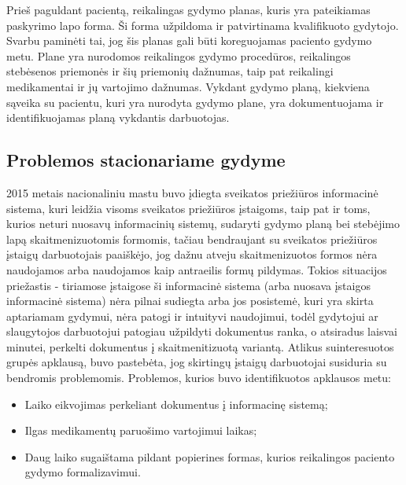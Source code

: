 Prieš paguldant pacientą, reikalingas gydymo planas, kuris yra pateikiamas paskyrimo lapo forma. Ši forma užpildoma ir patvirtinama kvalifikuoto gydytojo. Svarbu paminėti tai, jog šis planas gali būti koreguojamas paciento gydymo metu. Plane yra nurodomos reikalingos gydymo procedūros, reikalingos stebėsenos priemonės ir šių priemonių dažnumas, taip pat reikalingi medikamentai ir jų vartojimo dažnumas. Vykdant gydymo planą, kiekviena sąveika su pacientu, kuri yra nurodyta gydymo plane, yra dokumentuojama ir identifikuojamas planą vykdantis darbuotojas.
\subsection{Problemos stacionariame gydyme}
2015 metais nacionaliniu mastu buvo įdiegta sveikatos priežiūros informacinė sistema, kuri leidžia visoms sveikatos priežiūros įstaigoms, taip pat ir toms, kurios neturi nuosavų informacinių sistemų, sudaryti gydymo planą bei stebėjimo lapą skaitmenizuotomis formomis, tačiau bendraujant su sveikatos priežiūros įstaigų darbuotojais paaiškėjo, jog dažnu atveju skaitmenizuotos formos nėra naudojamos arba naudojamos kaip antraeilis formų pildymas. Tokios situacijos priežastis - tiriamose įstaigose ši informacinė sistema (arba nuosava įstaigos informacinė sistema) nėra pilnai sudiegta arba jos posistemė, kuri yra skirta aptariamam gydymui, nėra patogi ir intuityvi naudojimui, todėl gydytojui ar slaugytojos darbuotojui patogiau užpildyti dokumentus ranka, o atsiradus laisvai minutei, perkelti dokumentus į skaitmenitizuotą variantą. Atlikus suinteresuotos grupės apklausą, buvo pastebėta, jog skirtingų įstaigų darbuotojai susiduria su bendromis problemomis. Problemos, kurios buvo identifikuotos apklausos metu: 
\begin{itemize}
    \item Laiko eikvojimas perkeliant dokumentus į informacinę sistemą;
    \item Ilgas medikamentų paruošimo vartojimui laikas;
    \item Daug laiko sugaištama pildant popierines formas, kurios reikalingos paciento gydymo formalizavimui.
\end{itemize}

